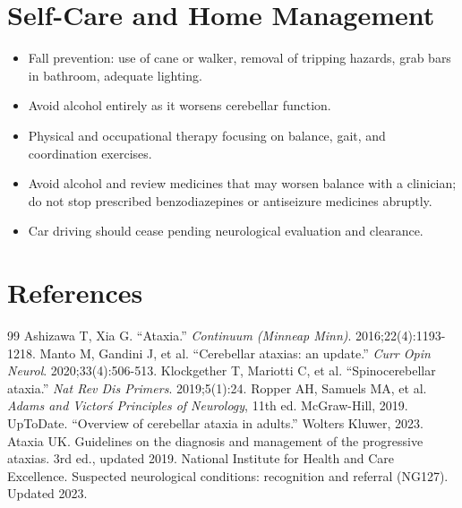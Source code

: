 \section*{Self-Care and Home Management}
\begin{itemize}
 \item Fall prevention: use of cane or walker, removal of tripping hazards, grab bars in bathroom, adequate lighting.
 \item Avoid alcohol entirely as it worsens cerebellar function.
 \item Physical and occupational therapy focusing on balance, gait, and coordination exercises.
 \item Avoid alcohol and review medicines that may worsen balance with a clinician; do not stop prescribed benzodiazepines or antiseizure medicines abruptly.
 \item Car driving should cease pending neurological evaluation and clearance.
\end{itemize}

\section*{References}
\begin{thebibliography}{99}
 Ashizawa T, Xia G. ``Ataxia.'' \textit{Continuum (Minneap Minn)}. 2016;22(4):1193-1218.
 Manto M, Gandini J, et al. ``Cerebellar ataxias: an update.'' \textit{Curr Opin Neurol}. 2020;33(4):506-513.
 Klockgether T, Mariotti C, et al. ``Spinocerebellar ataxia.'' \textit{Nat Rev Dis Primers}. 2019;5(1):24.
 Ropper AH, Samuels MA, et al. \textit{Adams and Victor\'s Principles of Neurology}, 11th ed. McGraw-Hill, 2019.
 UpToDate. ``Overview of cerebellar ataxia in adults.'' Wolters Kluwer, 2023.
 Ataxia UK. Guidelines on the diagnosis and management of the progressive ataxias. 3rd ed., updated 2019.
 National Institute for Health and Care Excellence. Suspected neurological conditions: recognition and referral (NG127). Updated 2023.
\end{thebibliography}
